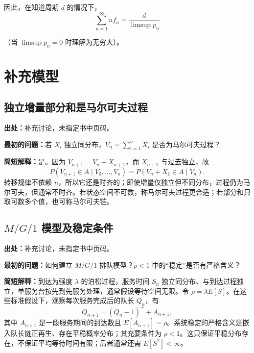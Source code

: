 \documentclass[11pt,a4paper]{ctexart}
\begin{document}
因此，在知道周期 $d$ 的情况下，
\[
\sum_{n=1}^{\infty}nf_n
=
\frac{d}{\limsup p_n}
\]

（当 $\limsup p_n=0$ 时理解为无穷大）。

\section{补充模型}

\subsection{独立增量部分和是马尔可夫过程}
\label{note:sp-random-walk-partial-sums}
\textbf{出处：}补充讨论，未指定书中页码。

\textbf{最初的问题：}若 $X_i$ 独立同分布，$V_n=\sum_{i=1}^nX_i$ 是否为马尔可夫过程？

\textbf{简短解释：}是。因为 $V_{n+1}=V_n+X_{n+1}$，而 $X_{n+1}$ 与过去独立，故
\[
 P(V_{n+1}\in A\mid V_0,\ldots,V_n)
 =P(V_n+X_1\in A\mid V_n).
\]
转移规律不依赖 $n$，所以它还是时齐的；即使增量仅独立但不同分布，过程仍为马尔可夫，但通常不时齐。若状态空间不可数，称马尔可夫过程更合适；若部分和只取可数多个值，也可称马尔可夫链。

\subsection{\texorpdfstring{$M/G/1$}{M/G/1} 模型及稳定条件}
\label{note:sp-mg1-model-stability}
\textbf{出处：}补充讨论，未指定书中页码。

\textbf{最初的问题：}如何建立 $M/G/1$ 排队模型？$\rho<1$ 中的“稳定”是否有严格含义？

\textbf{简短解释：}到达为强度 $\lambda$ 的泊松过程，服务时间 $S_n$ 独立同分布、与到达过程独立，单服务台按先到先服务处理，通常假设等待空间无限。令 $\rho=\lambda E[S]$。在这些标准假设下，观察每次服务完成后的队长 $Q_n$，有
\[
 Q_{n+1}=(Q_n-1)^++A_{n+1},
\]
其中 $A_{n+1}$ 是一段服务期间的到达数且 $E[A_{n+1}]=\rho$。系统稳定的严格含义是嵌入队长链正再生、存在平稳概率分布；其充要条件为 $\rho<1$。这只保证平稳分布存在，不保证平均等待时间有限；后者通常还需 $E[S^2]<\infty$。
\end{document}
